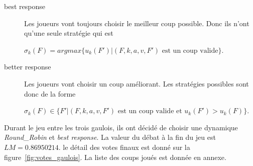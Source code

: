 \documentclass[11pt]{article}
\theoremstyle{defi}
\theoremstyle{not}
\theoremstyle{prob}
\begin{document}
        \begin{description}
          \item[best response] Les joueurs vont toujours choisir le meilleur coup possible.
          Donc ils n'ont qu'une seule stratégie qui est

          $\sigma_k(F) = argmax\{u_k(F') | (F, k, a, v, F') \mbox{ est un coup valide}\}$.

          \item[better response] Les joueurs vont choisir un coup améliorant. Les stratégies possibles sont donc de la forme

          $\sigma_k(F) \in \{F' | (F, k, a, v, F') \mbox{ est un coup valide et } u_k(F') > u_k(F)\}$.
        \end{description}


    Durant le jeu entre les trois gaulois, ils ont décidé de choisir une dynamique \emph{Round\_Robin} et \emph{best response}. La valeur du débat à la fin du jeu est $LM = 0.86950214$. le détail des votes finaux est donné sur la figure~\ref{fig:votes_gaulois}. La liste des coups joués est donnée en annexe.
\end{document}
